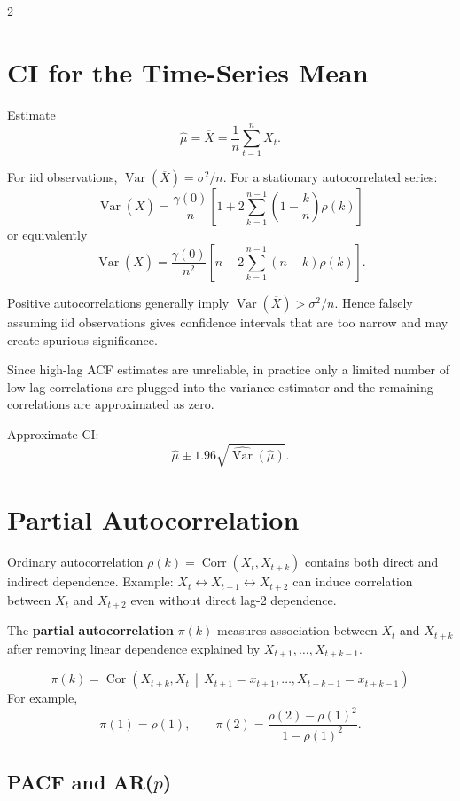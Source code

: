 \documentclass[9pt,a4paper]{extarticle}
\newcommand{\key}[1]{\textbf{#1}}
\begin{document}
\begin{multicols}{2}
\section{CI for the Time-Series Mean}

Estimate
\[
\widehat\mu=\overline X=\frac1n\sum_{t=1}^{n}X_t.
\]

For iid observations, \(\operatorname{Var}(\overline X)=\sigma^2/n\). For a stationary autocorrelated series:
\[
\boxed{
\operatorname{Var}(\overline X)=
\frac{\gamma(0)}{n}
\left[
1+2\sum_{k=1}^{n-1}
\left(1-\frac{k}{n}\right)\rho(k)
\right]
}
\]
or equivalently
\[
\operatorname{Var}(\overline X)=
\frac{\gamma(0)}{n^2}
\left[n+2\sum_{k=1}^{n-1}(n-k)\rho(k)\right].
\]

Positive autocorrelations generally imply \(\operatorname{Var}(\overline X)>\sigma^2/n\). Hence falsely assuming iid observations gives confidence intervals that are too narrow and may create spurious significance.

Since high-lag ACF estimates are unreliable, in practice only a limited number of low-lag correlations are plugged into the variance estimator and the remaining correlations are approximated as zero.

Approximate CI:
\[
\boxed{
\widehat\mu\pm1.96\sqrt{\widehat{\operatorname{Var}}(\widehat\mu)}
}.
\]

\section{Partial Autocorrelation}

Ordinary autocorrelation \(\rho(k)=\operatorname{Corr}(X_t,X_{t+k})\) contains both direct and indirect dependence. Example: \(X_t\leftrightarrow X_{t+1}\leftrightarrow X_{t+2}\) can induce correlation between \(X_t\) and \(X_{t+2}\) even without direct lag-2 dependence.

The \key{partial autocorrelation} \(\pi(k)\) measures association between \(X_t\) and \(X_{t+k}\) after removing linear dependence explained by \(X_{t+1},\ldots,X_{t+k-1}\).

\[
\pi(k)
=
\operatorname{Cor}
\left(
X_{t+k},X_t
\,\middle|\,
X_{t+1}=x_{t+1},\ldots,X_{t+k-1}=x_{t+k-1}
\right)
\]
For example,
\[
\pi(1)=\rho(1),\qquad
\pi(2)=\frac{\rho(2)-\rho(1)^2}{1-\rho(1)^2}.
\]

\subsection{PACF and AR($p$)}


\end{multicols}
\end{document}
